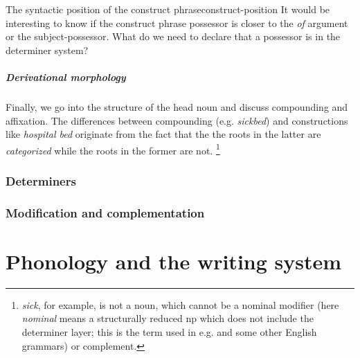 \documentclass[a4paper, oneside, 12pt]{report}
\newcommand*{\term}[1]{\emph{#1}}
\newcommand{\form}[1]{\emph{#1}}
\begin{document}
\begin{todobox}{The syntactic position of the construct phrase}{construct-position}
    It would be interesting to know if the construct phrase possessor
    is closer to the \form{of} argument or the subject-possessor.
    What do we need to declare that a possessor is in the determiner system?
\end{todobox}

\paragraph*{Derivational morphology}
Finally, we go into the structure of the head noun and discuss compounding and affixation.
The differences between compounding (e.g. \form{sickbed}) and constructions like \form{hospital bed}
originate from the fact that the the roots in the latter are \emph{categorized}
while the roots in the former are not.%
\footnote{
    \form{sick}, for example, is not a noun,
    which cannot be a nominal modifier
    (here \term{nominal} means a structurally reduced \ac{np} which does not include the determiner layer; this is the term used in e.g. \citet{cgel} and some other English grammars) or complement.
}

\subsection{Determiners}


\subsection{Modification and complementation}





\chapter{Phonology and the writing system}





\end{document}
